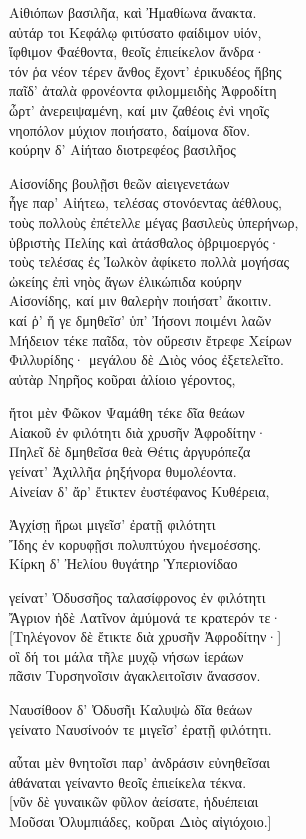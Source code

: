 \quad{}Αἰθιόπων βασιλῆα, καὶ Ἠμαθίωνα ἄνακτα. \\
αὐτάρ τοι Κεφάλῳ φιτύσατο φαίδιμον υἱόν, \\
ἴφθιμον Φαέθοντα, θεοῖς ἐπιείκελον ἄνδρα· \\
τόν ῥα νέον τέρεν ἄνθος ἔχοντ' ἐρικυδέος ἥβης\\
παῖδ' ἀταλὰ φρονέοντα φιλομμειδὴς Ἀφροδίτη\\
ὦρτ' ἀνερειψαμένη, καί μιν ζαθέοις ἐνὶ νηοῖς  \\
νηοπόλον μύχιον ποιήσατο, δαίμονα δῖον. \\
κούρην δ' Αἰήταο διοτρεφέος βασιλῆος

\quad{}Αἰσονίδης βουλῇσι θεῶν αἰειγενετάων\\
ἦγε παρ' Αἰήτεω, τελέσας στονόεντας ἀέθλους,\\
τοὺς πολλοὺς ἐπέτελλε μέγας βασιλεὺς ὑπερήνωρ, \\
ὑβριστὴς Πελίης καὶ ἀτάσθαλος ὀβριμοεργός· \\
τοὺς τελέσας ἐς Ἰωλκὸν ἀφίκετο πολλὰ μογήσας\\
ὠκείης ἐπὶ νηὸς ἄγων ἑλικώπιδα κούρην\\
Αἰσονίδης, καί μιν θαλερὴν ποιήσατ' ἄκοιτιν.\\
καί ῥ' ἥ γε δμηθεῖσ' ὑπ' Ἰήσονι ποιμένι λαῶν  \\
Μήδειον τέκε παῖδα, τὸν οὔρεσιν ἔτρεφε Χείρων\\
Φιλλυρίδης· μεγάλου δὲ Διὸς νόος ἐξετελεῖτο. \\
αὐτὰρ Νηρῆος κοῦραι ἁλίοιο γέροντος,

\quad{}ἤτοι μὲν Φῶκον Ψαμάθη τέκε δῖα θεάων\\
Αἰακοῦ ἐν φιλότητι διὰ χρυσῆν Ἀφροδίτην·  \\
Πηλεῖ δὲ δμηθεῖσα θεὰ Θέτις ἀργυρόπεζα\\
γείνατ' Ἀχιλλῆα ῥηξήνορα θυμολέοντα.\\
Αἰνείαν δ' ἄρ' ἔτικτεν ἐυστέφανος Κυθέρεια,

\quad{}Ἀγχίσῃ ἥρωι μιγεῖσ' ἐρατῇ φιλότητι \\
Ἴδης ἐν κορυφῇσι πολυπτύχου ἠνεμοέσσης. \\
Κίρκη δ' Ἠελίου θυγάτηρ Ὑπεριονίδαο

\quad{}γείνατ' Ὀδυσσῆος ταλασίφρονος ἐν φιλότητι\\
Ἄγριον ἠδὲ Λατῖνον ἀμύμονά τε κρατερόν τε· \\
{[}Τηλέγονον δὲ ἔτικτε διὰ χρυσῆν Ἀφροδίτην·{]}\\
οἳ δή τοι μάλα τῆλε μυχῷ νήσων ἱεράων \\ 
πᾶσιν Τυρσηνοῖσιν ἀγακλειτοῖσιν ἄνασσον.

\quad{}Ναυσίθοον δ' Ὀδυσῆι Καλυψὼ δῖα θεάων\\
γείνατο Ναυσίνοόν τε μιγεῖσ' ἐρατῇ φιλότητι. 

\quad{}αὗται μὲν θνητοῖσι παρ' ἀνδράσιν εὐνηθεῖσαι\\
ἀθάναται γείναντο θεοῖς ἐπιείκελα τέκνα. \\
{[}νῦν δὲ γυναικῶν φῦλον ἀείσατε, ἡδυέπειαι\\
Μοῦσαι Ὀλυμπιάδες, κοῦραι Διὸς αἰγιόχοιο.{]}
